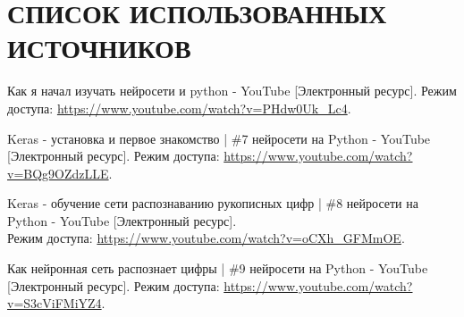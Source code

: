\newpage

\begingroup
  \section*{СПИСОК ИСПОЛЬЗОВАННЫХ ИСТОЧНИКОВ}

  \renewcommand{\addcontentsline}[3]{}%
  \renewcommand{\section}[2]{}%

  \begin{thebibliography}{}
	Как я начал изучать нейросети и python - YouTube
	[Электронный ресурс].
	Режим доступа: \url{https://www.youtube.com/watch?v=PHdw0Uk_Lc4}.

	Keras - установка и первое знакомство | \#7 нейросети на Python - YouTube
	[Электронный ресурс].
	Режим доступа: \url{https://www.youtube.com/watch?v=BQg9OZdzLLE}.

	Keras - обучение сети распознаванию рукописных цифр | \#8 нейросети на Python - YouTube
	[Электронный ресурс].\\
	Режим доступа: \url{https://www.youtube.com/watch?v=oCXh_GFMmOE}.

	Как нейронная сеть распознает цифры | \#9 нейросети на Python - YouTube
	[Электронный ресурс].
	Режим доступа: \url{https://www.youtube.com/watch?v=S3cViFMiYZ4}.
  \end{thebibliography}
\endgroup

\newpage
